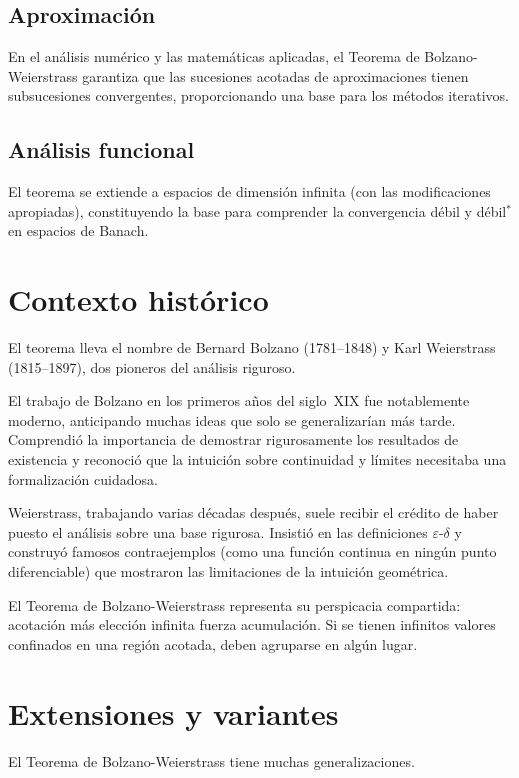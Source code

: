\subsection{Aproximación}

En el análisis numérico y las matemáticas aplicadas, el Teorema de
Bolzano-Weierstrass garantiza que las sucesiones acotadas de
aproximaciones tienen subsucesiones convergentes, proporcionando una
base para los métodos iterativos.

\subsection{Análisis funcional}

El teorema se extiende a espacios de dimensión infinita (con las
modificaciones apropiadas), constituyendo la base para comprender la
convergencia débil y débil$^*$ en espacios de Banach.

\section{Contexto histórico}

El teorema lleva el nombre de Bernard Bolzano (1781--1848) y Karl
Weierstrass (1815--1897), dos pioneros del análisis riguroso.

El trabajo de Bolzano en los primeros años del siglo~XIX fue
notablemente moderno, anticipando muchas ideas que solo se generalizarían
más tarde. Comprendió la importancia de demostrar rigurosamente los
resultados de existencia y reconoció que la intuición sobre continuidad
y límites necesitaba una formalización cuidadosa.

Weierstrass, trabajando varias décadas después, suele recibir el crédito
de haber puesto el análisis sobre una base rigurosa. Insistió en las
definiciones $\varepsilon$-$\delta$ y construyó famosos contraejemplos
(como una función continua en ningún punto diferenciable) que mostraron
las limitaciones de la intuición geométrica.

El Teorema de Bolzano-Weierstrass representa su perspicacia compartida:
acotación más elección infinita fuerza acumulación. Si se tienen
infinitos valores confinados en una región acotada, deben agruparse en
algún lugar.

\section{Extensiones y variantes}

El Teorema de Bolzano-Weierstrass tiene muchas generalizaciones.

